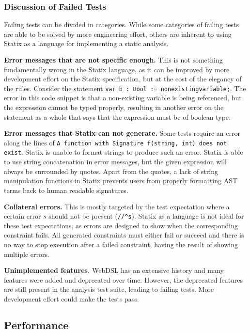     \subsubsection{Discussion of Failed Tests}

      Failing tests can be divided in categories. While some categories of failing tests are able to be solved by more engineering effort, others are inherent to using Statix as a language for implementing a static analysis.

      \textbf{Error messages that are not specific enough.} This is not something fundamentally wrong in the Statix language, as it can be improved by more development effort on the Statix specification, but at the cost of the elegancy of the rules. Consider the statement \texttt{var b : Bool := nonexistingvariable;}. The error in this code snippet is that a non-existing variable is being referenced, but the expression cannot be typed properly, resulting in another error on the statement as a whole that says that the expression must be of boolean type.

      \textbf{Error messages that Statix can not generate.} Some tests require an error along the lines of \texttt{A function with Signature f(string, int) does not exist}. Statix is unable to format strings to produce such an error. Statix is able to use string concatenation in error messages, but the given expression will always be surrounded by quotes. Apart from the quotes, a lack of string manipulation functions in Statix prevents users from properly formatting AST terms back to human readable signatures.

      \textbf{Collateral errors.} This is mostly targeted by the test expectation where a certain error $s$ should not be present (\texttt{//\^{}s}). Statix as a language is not ideal for these test expectations, as errors are designed to show when the corresponding constraint fails. All generated constraints must either fail or succeed and there is no way to stop execution after a failed constraint, having the result of showing multiple errors.

      \textbf{Unimplemented features.} WebDSL has an extensive history and many features were added and deprecated over time. However, the deprecated features are still present in the analysis test suite, leading to failing tests. More development effort could make the tests pass.

  \subsection{Performance}

